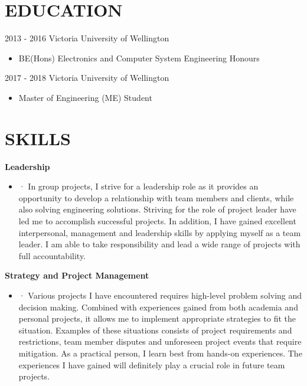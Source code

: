 \documentclass[3pt]{res}
\begin{document}
 
\thispagestyle{empty} %
\address{46 Furlong Crescent\\
Churton Park, Wellington 6037\\
+64 0210705328\\
andrewang321@gmail.com}


\begin{resume}

\section{EDUCATION}
\vspace{0.1in} 
   
     2013 - 2016 Victoria University of Wellington
      \begin{itemize} %
      \item[] BE(Hons) Electronics and Computer System Engineering Honours
      \end{itemize}
     
     2017 - 2018 Victoria University of Wellington
       \begin{itemize}
       \item Master of Engineering (ME) Student
       \end{itemize}
 
\section{SKILLS} 
\vspace{0.1in}
  {\bf Leadership}
    \begin{itemize} %
      \item[] ·	In group projects, I strive for a leadership role as it provides an opportunity to develop a relationship with team members and clients, while also solving engineering solutions. Striving for the role of project leader have led me to accomplish successful projects. In addition, I have gained excellent interpersonal, management and leadership skills by applying myself as a team leader. I am able to take responsibility and lead a wide range of projects with full accountability.
      \end{itemize}

{\bf Strategy and Project Management} 
       \begin{itemize}
        \item[] ·	Various projects I have encountered requires high-level problem solving and decision making. Combined with experiences gained from both academia and personal projects, it allows me to implement appropriate strategies to fit the situation. Examples of these situations consists of project requirements and restrictions, team member disputes and unforeseen project events that require mitigation. As a practical person, I learn best from hands-on experiences. The experiences I have gained will definitely play a crucial role in future team projects.
    \end{itemize}


\end{resume}
\end{document}
